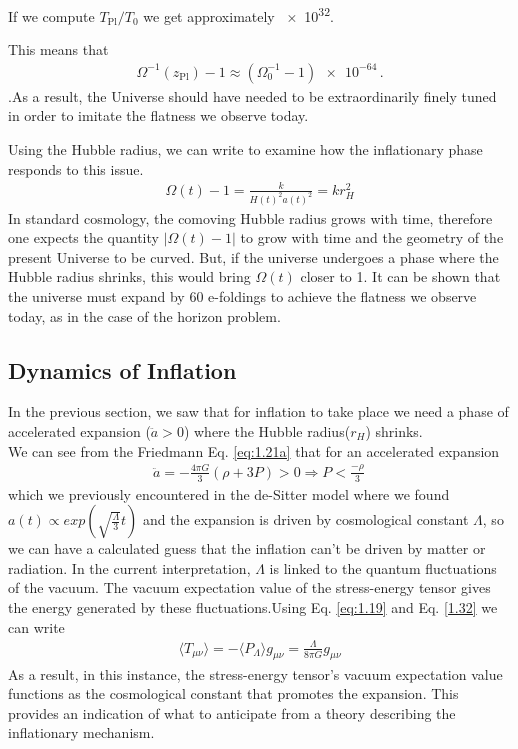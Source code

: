 If we compute \(T _{\text{Pl}} / T_0 \) we get approximately \num{e32}.

This means that 
\begin{align}
    \Omega^{-1}(z_{\text{Pl}}) - 1 \approx (\Omega_0^{-1} - 1) \num{e-64}\,.
\end{align}
.As a result, the Universe should have needed to be extraordinarily finely tuned in order to imitate the flatness we observe today.

Using the Hubble radius, we can write to examine how the inflationary phase responds to this issue.
\begin{align}
    \Omega(t)-1 = \frac{k}{H(t)^{2} a(t)^{2}} = kr_{H}^2
\end{align}
In standard cosmology, the comoving Hubble radius grows with time,
therefore one expects the quantity $|\Omega(t)-1|$ to grow with time and the geometry of the present Universe to be curved. But,
if the universe undergoes a phase where the Hubble radius shrinks, this would bring $\Omega(t)$ closer to 1. It can be shown that the universe must expand by 60 e-foldings to achieve the flatness we observe today, as in the case of the horizon problem.



\subsection{Dynamics of Inflation}

\hspace{0.5cm}In the previous section, we saw that for inflation to take place we need a phase of accelerated expansion ($\ddot{a} > 0$) where the Hubble radius($r_{H}$) shrinks.\\
We can see from the Friedmann Eq. \eqref{eq:1.21a} that for an accelerated expansion
\begin{align}
    \ddot{a} = -\frac{4 \pi G}{3}(\rho+3P) > 0 \Rightarrow P < \frac{-\rho}{3}\,\label{1.2.6}
\end{align}
which we previously encountered in the de-Sitter model where we found $a(t) \propto exp(\sqrt{\frac{\Lambda}{3}}t)$ and the expansion is driven by cosmological constant $\Lambda$, so we can have a calculated guess that the inflation can't be driven by matter or radiation. In the current interpretation, $\Lambda$ is linked to the quantum fluctuations of the vacuum. The vacuum expectation value of the stress-energy tensor gives the energy generated by these fluctuations.Using Eq. \eqref{eq:1.19} and Eq. \eqref{1.32} we can write
\\
\begin{align}
    \langle T_{\mu\nu} \rangle = -\langle P_{\Lambda} \rangle g_{\mu\nu} = \frac{\Lambda}{8\pi G} g_{\mu\nu} \label{1.2.7}
\end{align}
As a result, in this instance, the stress-energy tensor's vacuum expectation value functions as the cosmological constant that promotes the expansion. This provides an indication of what to anticipate from a theory describing the inflationary mechanism.


